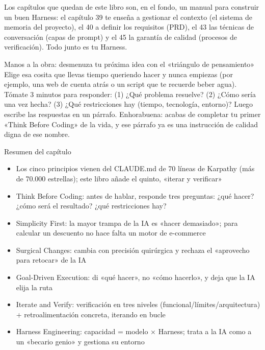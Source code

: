 Los capítulos que quedan de este libro son, en el fondo, un manual para construir un buen Harness: el capítulo 39 te enseña a gestionar el contexto (el sistema de memoria del proyecto), el 40 a definir los requisitos (PRD), el 43 las técnicas de conversación (capas de prompt) y el 45 la garantía de calidad (procesos de verificación). Todo junto es tu Harness.

\begin{tcbpractice}{Manos a la obra: desmenuza tu próxima idea con el «triángulo de pensamiento»}
Elige esa cosita que llevas tiempo queriendo hacer y nunca empiezas (por ejemplo, una web de cuenta atrás o un script que te recuerde beber agua). Tómate 3 minutos para responder: (1) ¿Qué problema resuelve? (2) ¿Cómo sería una vez hecha? (3) ¿Qué restricciones hay (tiempo, tecnología, entorno)? Luego escribe las respuestas en un párrafo. Enhorabuena: acabas de completar tu primer «Think Before Coding» de la vida, y ese párrafo ya es una instrucción de calidad digna de ese nombre.

\end{tcbpractice}

\begin{tcbsummary}{Resumen del capítulo}
\begin{itemize}
  \item Los cinco principios vienen del CLAUDE.md de 70 líneas de Karpathy (más de 70.000 estrellas); este libro añade el quinto, «iterar y verificar»
  \item Think Before Coding: antes de hablar, responde tres preguntas: ¿qué hacer? ¿cómo será el resultado? ¿qué restricciones hay?
  \item Simplicity First: la mayor trampa de la IA es «hacer demasiado»; para calcular un descuento no hace falta un motor de e-commerce
  \item Surgical Changes: cambia con precisión quirúrgica y rechaza el «aprovecho para retocar» de la IA
  \item Goal-Driven Execution: di «qué hacer», no «cómo hacerlo», y deja que la IA elija la ruta
  \item Iterate and Verify: verificación en tres niveles (funcional/límites/arquitectura) + retroalimentación concreta, iterando en bucle
  \item Harness Engineering: capacidad = modelo × Harness; trata a la IA como a un «becario genio» y gestiona su entorno
\end{itemize}

\end{tcbsummary}
